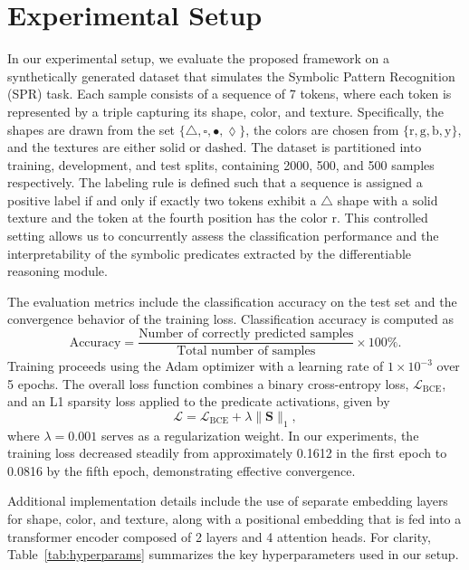 \documentclass{article}
\begin{document}
\section{Experimental Setup}
In our experimental setup, we evaluate the proposed framework on a synthetically generated dataset that simulates the Symbolic Pattern Recognition (SPR) task. Each sample consists of a sequence of 7 tokens, where each token is represented by a triple capturing its shape, color, and texture. Specifically, the shapes are drawn from the set \(\{\triangle, \square, \bullet, \lozenge\}\), the colors are chosen from \(\{\text{r}, \text{g}, \text{b}, \text{y}\}\), and the textures are either \(\text{solid}\) or \(\text{dashed}\). The dataset is partitioned into training, development, and test splits, containing 2000, 500, and 500 samples respectively. The labeling rule is defined such that a sequence is assigned a positive label if and only if exactly two tokens exhibit a \(\triangle\) shape with a \(\text{solid}\) texture and the token at the fourth position has the color \(\text{r}\). This controlled setting allows us to concurrently assess the classification performance and the interpretability of the symbolic predicates extracted by the differentiable reasoning module.

The evaluation metrics include the classification accuracy on the test set and the convergence behavior of the training loss. Classification accuracy is computed as
\[
\text{Accuracy} = \frac{\text{Number of correctly predicted samples}}{\text{Total number of samples}} \times 100\%.
\]
Training proceeds using the Adam optimizer with a learning rate of \(1\times10^{-3}\) over 5 epochs. The overall loss function combines a binary cross-entropy loss, \(\mathcal{L}_{\mathrm{BCE}}\), and an L1 sparsity loss applied to the predicate activations, given by
\[
\mathcal{L} = \mathcal{L}_{\mathrm{BCE}} + \lambda \|\mathbf{S}\|_1,
\]
where \(\lambda=0.001\) serves as a regularization weight. In our experiments, the training loss decreased steadily from approximately 0.1612 in the first epoch to 0.0816 by the fifth epoch, demonstrating effective convergence.

Additional implementation details include the use of separate embedding layers for shape, color, and texture, along with a positional embedding that is fed into a transformer encoder composed of 2 layers and 4 attention heads. For clarity, Table~\ref{tab:hyperparams} summarizes the key hyperparameters used in our setup.
\end{document}
